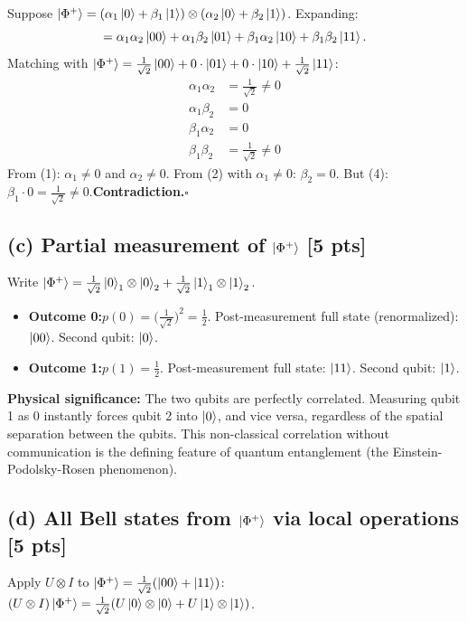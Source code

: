 \documentclass[11pt,a4paper]{article}
\begin{document}
Suppose $\ket{\Phi^+}=(\alpha_1\ket{0}+\beta_1\ket{1})\otimes(\alpha_2\ket{0}+\beta_2\ket{1})$.
Expanding:
\[
=\alpha_1\alpha_2\ket{00}+\alpha_1\beta_2\ket{01}+\beta_1\alpha_2\ket{10}+\beta_1\beta_2\ket{11}.
\]
Matching with $\ket{\Phi^+}=\tfrac{1}{\sqrt{2}}\ket{00}+0\cdot\ket{01}+0\cdot\ket{10}+\tfrac{1}{\sqrt{2}}\ket{11}$:
\begin{align}
\alpha_1\alpha_2 &= \tfrac{1}{\sqrt{2}} \ne 0 \tag{1}\\
\alpha_1\beta_2  &= 0 \tag{2}\\
\beta_1\alpha_2  &= 0 \tag{3}\\
\beta_1\beta_2   &= \tfrac{1}{\sqrt{2}} \ne 0 \tag{4}
\end{align}
From (1): $\alpha_1\ne0$ and $\alpha_2\ne0$.\;
From (2) with $\alpha_1\ne0$: $\beta_2=0$.\;
But (4): $\beta_1\cdot0=\tfrac{1}{\sqrt{2}}\ne0$.\quad\textbf{Contradiction.}\quad$\square$

\subsection*{(c) Partial measurement of $\ket{\Phi^+}$ [5 pts]}

Write $\ket{\Phi^+}=\tfrac{1}{\sqrt{2}}\ket{0}_1\otimes\ket{0}_2+\tfrac{1}{\sqrt{2}}\ket{1}_1\otimes\ket{1}_2$.

\begin{itemize}
  \item \textbf{Outcome 0:}\quad $p(0)=\bigl(\tfrac{1}{\sqrt{2}}\bigr)^2=\tfrac{1}{2}$.
    Post-measurement full state (renormalized): $\ket{00}$.
    Second qubit: $\ket{0}$.
  \item \textbf{Outcome 1:}\quad $p(1)=\tfrac{1}{2}$.
    Post-measurement full state: $\ket{11}$.
    Second qubit: $\ket{1}$.
\end{itemize}

\noindent\textbf{Physical significance:} The two qubits are perfectly correlated.
Measuring qubit 1 as $0$ instantly forces qubit 2 into $\ket{0}$, and vice versa, regardless
of the spatial separation between the qubits. This non-classical correlation without communication is
the defining feature of quantum entanglement (the Einstein-Podolsky-Rosen phenomenon).

\subsection*{(d) All Bell states from $\ket{\Phi^+}$ via local operations [5 pts]}

Apply $U\otimes I$ to $\ket{\Phi^+}=\tfrac{1}{\sqrt{2}}(\ket{00}+\ket{11})$:
$(U\otimes I)\ket{\Phi^+}=\tfrac{1}{\sqrt{2}}(U\ket{0}\otimes\ket{0}+U\ket{1}\otimes\ket{1})$.
\end{document}
